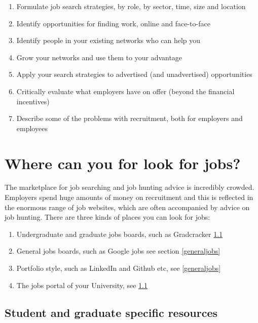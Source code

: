 \documentclass[
]{book}
\providecommand{\tightlist}{%
  \setlength{\itemsep}{0pt}\setlength{\parskip}{0pt}}
\begin{document}
\begin{enumerate}
\def\labelenumi{\arabic{enumi}.}
\tightlist
\item
  Formulate job search strategies, by role, by sector, time, size and location
\item
  Identify opportunities for finding work, online and face-to-face
\item
  Identify people in your existing networks who can help you
\item
  Grow your networks and use them to your advantage
\item
  Apply your search strategies to advertised (and unadvertised) opportunities
\item
  Critically evaluate what employers have on offer (beyond the financial incentives)
\item
  Describe some of the problems with recruitment, both for employers and employees
\end{enumerate}

\hypertarget{looking}{%
\section{Where can you for look for jobs?}\label{looking}}

The marketplace for job searching and job hunting advice is incredibly crowded. Employers spend huge amounts of money on recruitment and this is reflected in the enormous range of job websites, which are often accompanied by advice on job hunting. There are three kinds of places you can look for jobs:

\begin{enumerate}
\def\labelenumi{\arabic{enumi}.}
\tightlist
\item
  Undergraduate and graduate jobs boards, such as Gradcracker \ref{studentjobs}
\item
  General jobs boards, such as Google jobs see section \ref{generaljobs}
\item
  Portfolio style, such as LinkedIn and Github etc, see \ref{generaljobs}
\item
  The jobs portal of your University, see \ref{studentjobs}
\end{enumerate}

\hypertarget{studentjobs}{%
\subsection{Student and graduate specific resources}\label{studentjobs}}
\end{document}
